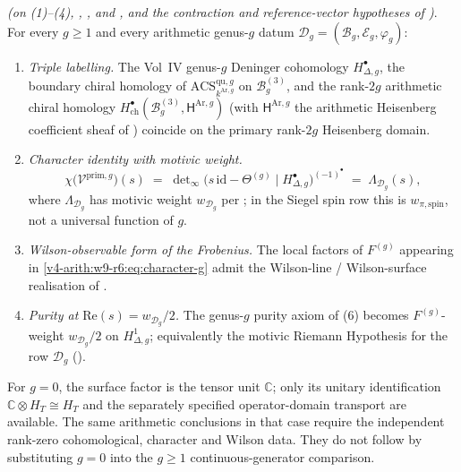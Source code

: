 \begin{theorem}
\label{v4-arith:w9-r6:thm:deninger-g-full}
\ClaimStatusProvedHereConditional \emph{(on
(1)--(4),
,
, and
, and the contraction and
reference-vector hypotheses of
)}.
For every $g\ge1$ and every
arithmetic genus-\(g\) datum
\(\mathcal{D}_{g}=(\mathcal{B}_{g},\mathcal{E}_{g},\varphi_{g})\):
\begin{enumerate}
\item \emph{Triple labelling.} The Vol~IV genus-\(g\) Deninger
cohomology \(H^{\bullet}_{\Delta,g}\), the boundary chiral homology
of \(\mathrm{ACS}^{\mathrm{qu},g}_{k^{\mathrm{Ar},g}}\) on
\(\mathcal{B}_{g}^{(3)}\), and the rank-\(2g\) arithmetic chiral homology
\(H^{\bullet}_{\mathrm{ch}}(\mathcal{B}_{g}^{(3)},\mathsf{H}^{\mathrm{Ar},g})\)
(with \(\mathsf{H}^{\mathrm{Ar},g}\) the arithmetic Heisenberg coefficient
sheaf of )
coincide on the primary rank-\(2g\) Heisenberg domain.
\item \emph{Character identity with motivic weight.}
\begin{equation}
\label{v4-arith:w9-r6:eq:character-g}
\chi\bigl(\mathcal{V}^{\mathrm{prim},g}\bigr)(s)
\;=\;\det\nolimits_{\infty}\bigl(s\,\mathrm{id}-\Theta^{(g)}\mid H^{\bullet}_{\Delta,g}\bigr)^{(-1)^{\bullet}}
\;=\;\Lambda_{\mathcal{D}_{g}}(s),
\end{equation}
where \(\Lambda_{\mathcal{D}_{g}}\) has motivic weight
\(w_{\mathcal{D}_{g}}\) per ; in the
Siegel spin row this is \(w_{\pi,\mathrm{spin}}\), not a universal
function of \(g\).
\item \emph{Wilson-observable form of the Frobenius.} The local
factors of \(F^{(g)}\) appearing in
\eqref{v4-arith:w9-r6:eq:character-g} admit the Wilson-line /
Wilson-surface realisation of
.
\item \emph{Purity at \(\mathrm{Re}(s)=w_{\mathcal{D}_{g}}/2\).}
The genus-\(g\) purity axiom of (6)
becomes \(F^{(g)}\)-weight \(w_{\mathcal{D}_{g}}/2\) on
\(H^{1}_{\Delta,g}\); equivalently the motivic Riemann Hypothesis for
the row \(\mathcal{D}_{g}\) ().
\end{enumerate}
For $g=0$, the surface factor is the tensor unit $\mathbb C$;
only its unitary identification $\mathbb C\otimes H_T\cong H_T$
and the separately specified operator-domain transport are available.
The same arithmetic conclusions in that case require the independent
rank-zero cohomological, character and Wilson data. They do not follow
by substituting $g=0$ into the $g\ge1$ continuous-generator comparison.
\end{theorem}

